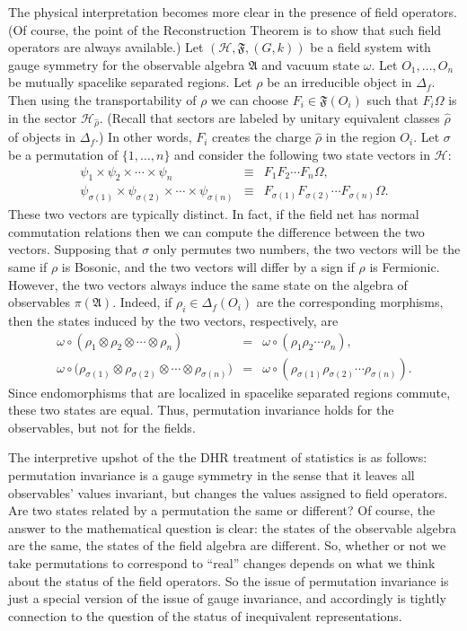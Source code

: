 \documentclass[11pt]{article}
\theoremstyle{definition}
\theoremstyle{definition}
\theoremstyle{remark}
\def\2#1{{\mathcal #1}}
\def\al#1{{\mathfrak #1}}
\def\om{\omega} \def\Om{\Omega} \def\dd{\partial} \def\D{\Delta}
\begin{document}
The physical interpretation becomes more clear in the presence of
field operators.  (Of course, the point of the Reconstruction Theorem
is to show that such field operators are always available.)  Let $(\2H
,\al F,(G,k))$ be a field system with gauge symmetry for the
observable algebra $\al A$ and vacuum state $\om$.  Let $O_1,\dots
,O_n$ be mutually spacelike separated regions.  Let $\rho$ be an
irreducible object in $\D _f$.  Then using the transportability of
$\rho$ we can choose $F_i\in \al F(O_i)$ such that $F_i\Om$ is in the
sector $\2H _{\hat{\rho}}$.  (Recall that sectors are labeled by
unitary equivalent classes $\hat{\rho}$ of objects in $\D _f$.)  In
other words, $F_i$ creates the charge $\hat{\rho}$ in the region
$O_i$.  Let $\sigma$ be a permutation of $\{ 1,\dots ,n \}$ and
consider the following two state vectors in $\2H$:
\begin{eqnarray}
  \psi _1\times \psi _2\times \cdots \times \psi _n &\equiv & F_1F_2\cdots
  F_n\Om  ,\label{ident} \\
  \psi _{\sigma (1)}\times \psi _{\sigma (2)}\times \cdots \times \psi _{\sigma
    (n)} & \equiv & F_{\sigma (1)}F_{\sigma (2)}\cdots F_{\sigma
    (n)}\Om . \label{permu}
\end{eqnarray}
These two vectors are typically distinct.  In fact, if the field net
has normal commutation relations then we can compute the difference
between the two vectors.  Supposing that $\sigma$ only permutes two
numbers, the two vectors will be the same if $\rho$ is Bosonic, and
the two vectors will differ by a sign if $\rho$ is Fermionic.
However, the two vectors always induce the same state on the algebra
of observables $\pi (\al A)$.  Indeed, if $\rho _i\in \D _f(O_i)$ are
the corresponding morphisms, then the states induced by the two
vectors, respectively, are
\begin{eqnarray}
  \om \circ (\rho  _1\otimes \rho _2\otimes \cdots \otimes \rho _n) &=& \om \circ (\rho _1\rho
  _2\cdots \rho _n) ,\\
  \om \circ \bigl( \rho _{\sigma (1)}\otimes \rho _{\sigma (2)}\otimes
  \cdots \otimes \rho _{\sigma (n)}\bigr) & = & \om \circ (\rho _{\sigma (1)}\rho
  _{\sigma (2)}\cdots \rho _{\sigma (n)}) .
\end{eqnarray}
Since endomorphisms that are localized in spacelike separated regions
commute, these two states are equal.  Thus, permutation invariance
holds for the observables, but not for the fields.

The interpretive upshot of the the DHR treatment of statistics is as
follows: permutation invariance is a gauge symmetry in the sense that
it leaves all observables' values invariant, but changes the values
assigned to field operators.  Are two states related by a permutation
the same or different?  Of course, the answer to the mathematical
question is clear: the states of the observable algebra are the same,
the states of the field algebra are different.  So, whether or not we
take permutations to correspond to ``real'' changes depends on what we
think about the status of the field operators.  So the issue of
permutation invariance is just a special version of the issue of gauge
invariance, and accordingly is tightly connection to the question of
the status of inequivalent representations.
\end{document}
